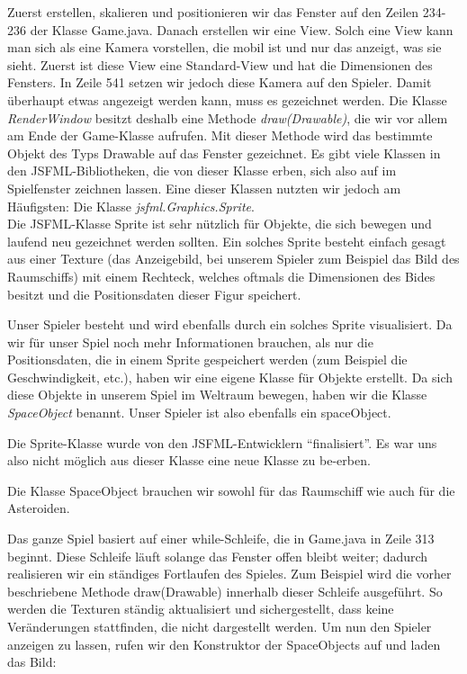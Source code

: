 \documentclass[12pt,a4paper]{scrartcl}
\newcommand{\q}[1]{``#1''}
\begin{document}
Zuerst erstellen, skalieren und positionieren wir das Fenster auf den Zeilen 234-236 der Klasse Game.java.
Danach erstellen wir eine View.
Solch eine View kann man sich als eine Kamera vorstellen, die mobil ist und nur das anzeigt, was sie sieht.
Zuerst ist diese View eine Standard-View und hat die Dimensionen des Fensters.
In Zeile 541 setzen wir jedoch diese Kamera auf den Spieler.
Damit überhaupt etwas angezeigt werden kann, muss es gezeichnet werden. 
Die Klasse \textit{RenderWindow} besitzt deshalb eine Methode \textit{draw(Drawable)}, die wir vor allem am Ende der Game-Klasse aufrufen.
Mit dieser Methode wird das bestimmte Objekt des Typs Drawable auf das Fenster gezeichnet.
Es gibt viele Klassen in den JSFML-Bibliotheken, die von dieser Klasse erben, sich also auf im Spielfenster zeichnen lassen.
Eine dieser Klassen nutzten wir jedoch am Häufigsten: Die Klasse \textit{jsfml.Graphics.Sprite}.		\\
Die JSFML-Klasse Sprite ist sehr nützlich für Objekte, die sich bewegen und laufend neu gezeichnet werden sollten.
Ein solches Sprite besteht einfach gesagt aus einer Texture (das Anzeigebild, bei unserem Spieler zum Beispiel das Bild des Raumschiffs) mit einem Rechteck,
welches oftmals die Dimensionen des Bides besitzt und die Positionsdaten dieser Figur speichert.

Unser Spieler besteht und wird ebenfalls durch ein solches Sprite visualisiert.
Da wir für unser Spiel noch mehr Informationen brauchen, als nur die Positionsdaten, die in einem
Sprite gespeichert werden (zum Beispiel die Geschwindigkeit, etc.), haben wir eine eigene Klasse für Objekte erstellt. Da sich diese Objekte
in unserem Spiel im Weltraum bewegen, haben wir die Klasse \textit{SpaceObject} benannt. Unser Spieler ist also ebenfalls ein spaceObject.

Die Sprite-Klasse wurde von den JSFML-Entwicklern \q{finalisiert}. Es war uns also nicht
möglich aus dieser Klasse eine neue Klasse zu be-erben.


Die Klasse SpaceObject brauchen wir sowohl für das Raumschiff wie auch für die Asteroiden.


Das ganze Spiel basiert auf einer while-Schleife, die in Game.java in Zeile 313 beginnt.
Diese Schleife läuft solange das Fenster offen bleibt weiter; dadurch realisieren wir ein ständiges Fortlaufen des Spieles.
Zum Beispiel wird die vorher beschriebene Methode draw(Drawable) innerhalb dieser Schleife ausgeführt.
So werden die Texturen ständig aktualisiert und sichergestellt, dass keine Veränderungen stattfinden, die nicht dargestellt werden.
Um nun den Spieler anzeigen zu lassen, rufen wir den Konstruktor der SpaceObjects auf und laden das Bild: 	\\
\end{document}
